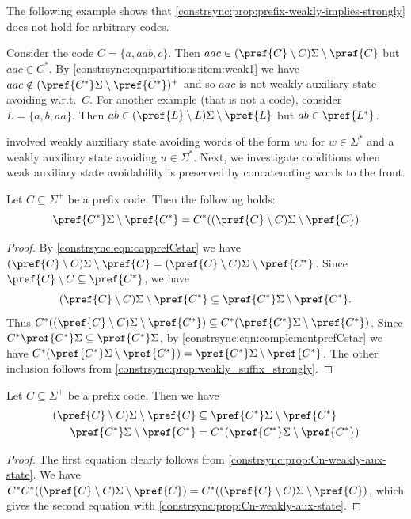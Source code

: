 The following example shows that \cref{constrsync:prop:prefix-weakly-implies-strongly} does not hold for arbitrary codes.

\begin{example}
	Consider the code $C = \{a,aab,c\}$.
	Then $aac \in (\pref{C} \setminus C)\Sigma \setminus \pref{C}$
	but $aac \in C^*$.
	By \cref{constrsync:eqn:partitions:item:weak1}
	we have $aac \notin ( \pref{C^*}\Sigma \setminus \pref{C^*} )^+$
	and so $aac$ is not weakly auxiliary state avoiding w.r.t.~$C$.
	For another example (that is not a code),
	consider $L = \{a,b,aa\}$.
	Then $ab \in (\pref{L}\setminus L)\Sigma \setminus \pref{L}$
	but $ab \in \pref{L^*}$.
\end{example}

 involved weakly auxiliary state avoiding words of the form
$wu$ for $w \in \Sigma^*$ and a weakly auxiliary state avoiding $u \in \Sigma^*$.
Next, we investigate conditions when weak auxiliary state avoidability
is preserved by concatenating words to the front.

\begin{proposition} \label{constrsync:prop:Cn-weakly-aux-state}
	Let $C \subseteq \Sigma^+$ be a prefix code.
	Then the following holds:
	\[
	\pref{C^*}\Sigma \setminus \pref{C^*} = C^* ( (\pref{C} \setminus C)\Sigma \setminus \pref{C} )
	\]	
\end{proposition}
\begin{proof}
	By \cref{constrsync:eqn:capprefCstar} we have 
	$(\pref{C} \setminus C)\Sigma \setminus \pref{C} = (\pref{C} \setminus C)\Sigma \setminus \pref{C^*}$.
	Since $\pref{C}\setminus C \subseteq \pref{C^*}$,
	we have
	\[
	(\pref{C} \setminus C)\Sigma \setminus \pref{C^*} \subseteq \pref{C^*}\Sigma \setminus \pref{C^*}.
	\]
	Thus $C^* ( (\pref{C} \setminus C)\Sigma \setminus \pref{C^*} )
	\subseteq C^* ( \pref{C^*}\Sigma \setminus \pref{C^*} )$.
	Since  $C^* \pref{C^*}\Sigma \subseteq  \pref{C^*}\Sigma$,
	by \cref{constrsync:eqn:complementprefCstar} 
	we have $C^* ( \pref{C^*}\Sigma \setminus \pref{C^*} ) 
	= \pref{C^*}\Sigma \setminus \pref{C^*}$.
	The other inclusion follows from \cref{constrsync:prop:weakly_suffix_strongly}.
\end{proof}

\begin{corollary} \label{constrsync:cor:Cweakly-aux-state0}
	Let $C \subseteq \Sigma^+$ be a prefix code. Then we have
	\begin{align*}
		(\pref{C}\setminus C)\Sigma \setminus \pref{C} & \subseteq \pref{C^*}\Sigma \setminus \pref{C^*} \\
			\pref{C^*}\Sigma \setminus \pref{C^*} & = C^* ( \pref{C^*}\Sigma \setminus \pref{C^*} )
	\end{align*}	
\end{corollary}
\begin{proof}
	The first equation clearly follows from \cref{constrsync:prop:Cn-weakly-aux-state}.
	We have $C^* C^* ( (\pref{C} \setminus C)\Sigma \setminus \pref{C} )
	= C^* ( (\pref{C} \setminus C)\Sigma \setminus \pref{C} )$, which gives
	the second equation with \cref{constrsync:prop:Cn-weakly-aux-state}.	
\end{proof}

